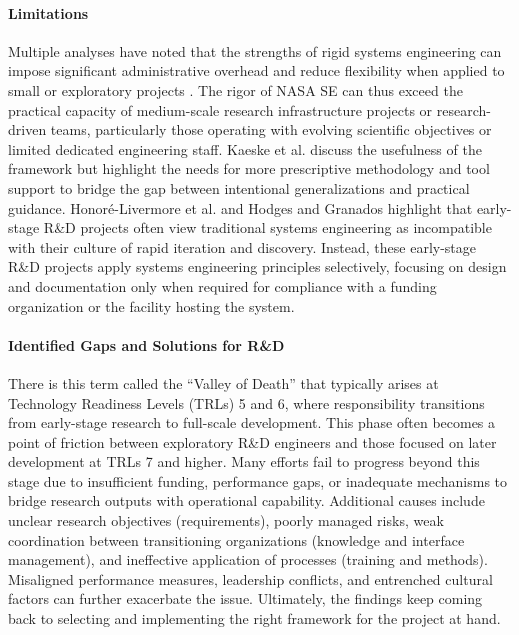 \paragraph{Limitations}
Multiple analyses have noted that the strengths of rigid systems engineering can impose significant administrative overhead and reduce flexibility when applied to small or exploratory projects \cite{r&dSE}. 
The rigor of NASA SE can thus exceed the practical capacity of medium-scale research infrastructure projects or research-driven teams, particularly those operating with evolving scientific objectives or limited dedicated engineering staff.
Kaeske et al. \cite{Kaeske_Wagner_Albers_Russenschuck_2024} discuss the usefulness of the framework but highlight the needs for more prescriptive methodology and tool support to bridge the gap between intentional generalizations and practical guidance.
Honoré-Livermore et al. \cite{academicsPerceptionSE} and Hodges and Granados \cite{r&dSEbridge} highlight that early-stage R\&D projects often view traditional systems engineering as incompatible with their culture of rapid iteration and discovery. 
Instead, these early-stage R\&D projects apply systems engineering principles selectively, focusing on design and documentation only when required for compliance with a funding organization or the facility hosting the system.

\paragraph{Identified Gaps and Solutions for R\&D}
There is this term called the “Valley of Death” that typically arises at Technology Readiness Levels (TRLs) 5 and 6, where responsibility transitions from early-stage research to full-scale development. 
This phase often becomes a point of friction between exploratory R\&D engineers and those focused on later development at TRLs 7 and higher.\cite{r&dSE} 
Many efforts fail to progress beyond this stage due to insufficient funding, performance gaps, or inadequate mechanisms to bridge research outputs with operational capability. 
Additional causes include unclear research objectives (requirements), poorly managed risks, weak coordination between transitioning organizations (knowledge and interface management), and ineffective application of processes (training and methods). 
Misaligned performance measures, leadership conflicts, and entrenched cultural factors can further exacerbate the issue. 
Ultimately, the findings keep coming back to selecting and implementing the right framework for the project at hand.


